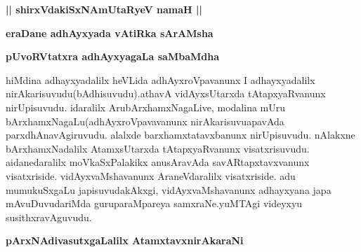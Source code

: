 \begin{center}
{\large\bf || shirxVdakiSxNAmUtaRyeV namaH ||}
\bigskip

{\Large\bf eraDane adhAyxyada vAtiRka sArAMsha}
\end{center}


\begin{artha}
{\bf pUvoRVtatxra adhAyxyagaLa saMbaMdha}
\end{artha}


\begin{artha}
hiMdina adhayxyadalilx heVLida adhAyxroVpavanunx I adhayxyadalilx nirAkarisuvudu(bAdhisuvudu).athavA vidAyxsUtarxda tAtapxyaRvanunx nirUpisuvudu. idaralilx ArubArxhamxNagaLive, modalina mUru bArxhamxNagaLu(adhAyxroVpavavanunx nirAkarisuvuapavAda parxdhAnavAgiruvudu. alalxde barxhamxtatavxbanunx nirUpisuvudu. nAlakxne bArxhamxNadalilx AtamxsUtarxda tAtapxyaRvanunx visatxrisuvudu. aidanedaralilx moVkaSxPalakikx anusAravAda savARtapxtavxvanunx visatxriside. vidAyxvaMshavanunx AraneVdaralilx visatxriside. adu mumukuSxgaLu japisuvudakAkxgi, vidAyxvaMshavanunx adhayxyana japa mAvuDuvudariMda guruparaMpareya samxraNe.yuMTAgi videyxyu susithxravAguvudu.
\end{artha}

\begin{center}
\begin{artha}
{\bf pArxNAdivasutxgaLalilx AtamxtavxnirAkaraNi }
\end{artha}
\end{center}

